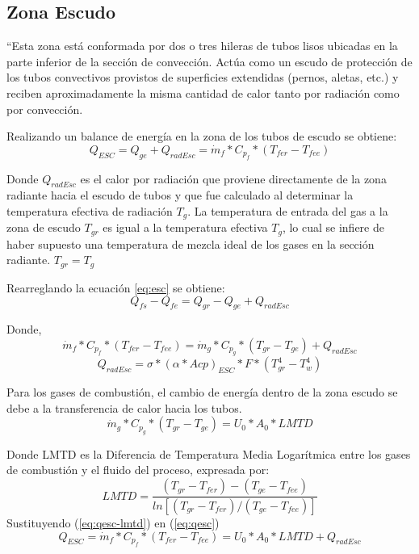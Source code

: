 \subsection{Zona Escudo}
\par “Esta zona está conformada por dos o tres hileras de tubos lisos ubicadas en la parte inferior de la sección de convección. Actúa como un escudo de protección de los tubos convectivos provistos de superficies extendidas (pernos, aletas, etc.) y reciben aproximadamente la misma cantidad de calor tanto por radiación como por convección.
\par Realizando un balance de energía en la zona de los tubos de escudo se obtiene:
\begin{equation}
\label{eq:esc}
Q_{ESC} = Q_{ge} + Q_{radEsc} = \dot m_{f} *C_{p_f} *(T_{fer} - T_{fee})
\end{equation}
\par Donde $Q_{radEsc}$ es el calor por radiación que proviene directamente de la zona radiante hacia el escudo de tubos y que fue calculado al determinar la temperatura efectiva de radiación $T_g$. La temperatura de entrada del gas a la zona de escudo $T_{gr}$ es igual a la temperatura efectiva $T_g$, lo cual se infiere de haber supuesto una temperatura de mezcla ideal de los gases en la sección radiante. $T_{gr} = T_g$
\par Rearreglando la ecuación \ref{eq:esc} se obtiene:
\begin{equation}
Q_{fs} - Q_{fe} = Q_{gr} - Q_{ge} + Q_{radEsc}
\end{equation}
\par Donde,
\begin{equation}
\label{eq:qesc}
\dot m_{f} *C_{p_f} *(T_{fer} - T_{fee}) = 
\dot m_{g} *C_{p_g} *(T_{gr}  - T_{ge}) + Q_{radEsc}
\end{equation}
\begin{equation} \label{eq:esc-radi}
Q_{radEsc} = \sigma *(\alpha *Acp )_{ESC} *F *(T_{gr}^4 -T_w^4)
\end{equation}
\par Para los gases de combustión, el cambio de energía dentro de la zona escudo se debe a la transferencia de calor hacia los tubos.
\begin{equation}
\label{eq:qesc-lmtd}
\dot m_{g} *C_{p_g} *(T_{gr} -T_{ge}) = U_0 *A_0 *LMTD
\end{equation}
\par Donde LMTD es la Diferencia de Temperatura Media Logarítmica entre los gases de combustión y el fluido del proceso, expresada por:
\begin{equation}
\label{eq:lmtd}
   LMTD = \frac{(T_{gr}-T_{fer}) - (T_{ge}-T_{fee})}
   {ln[(T_{gr}-T_{fer}) /(T_{ge}-T_{fee})]}
\end{equation}
Sustituyendo (\ref{eq:qesc-lmtd}) en (\ref{eq:qesc})
\begin{equation}
\label{eq:tesc}
  Q_{ESC} = \dot m_{f} *C_{p_f} *(T_{fer} - T_{fee}) = U_0 *A_0 *LMTD + Q_{radEsc}
\end{equation}

